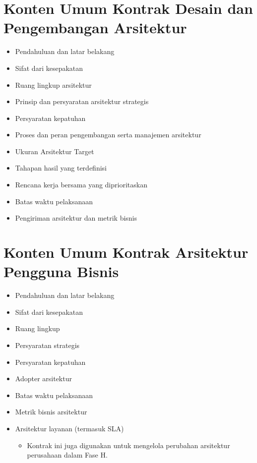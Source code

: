 \section{Konten Umum Kontrak Desain dan Pengembangan Arsitektur}
\begin{itemize}
	\item Pendahuluan dan latar belakang
	\item Sifat dari kesepakatan
	\item Ruang lingkup arsitektur
	\item Prinsip dan persyaratan arsitektur strategis
	\item Persyaratan kepatuhan
	\item Proses dan peran pengembangan serta manajemen arsitektur
	\item Ukuran Arsitektur Target
	\item Tahapan hasil yang terdefinisi
	\item Rencana kerja bersama yang diprioritaskan
	\item Batas waktu pelaksanaan
	\item Pengiriman arsitektur dan metrik bisnis
\end{itemize}

\section{Konten Umum Kontrak Arsitektur Pengguna Bisnis}
\begin{itemize}
	\item Pendahuluan dan latar belakang
	\item Sifat dari kesepakatan
	\item Ruang lingkup
	\item Persyaratan strategis
	\item Persyaratan kepatuhan
	\item Adopter arsitektur
	\item Batas waktu pelaksanaan
	\item Metrik bisnis arsitektur
	\item Arsitektur layanan (termasuk SLA)
	\begin{itemize}
		\item Kontrak ini juga digunakan untuk mengelola perubahan arsitektur perusahaan dalam Fase H.
	\end{itemize}
\end{itemize}

